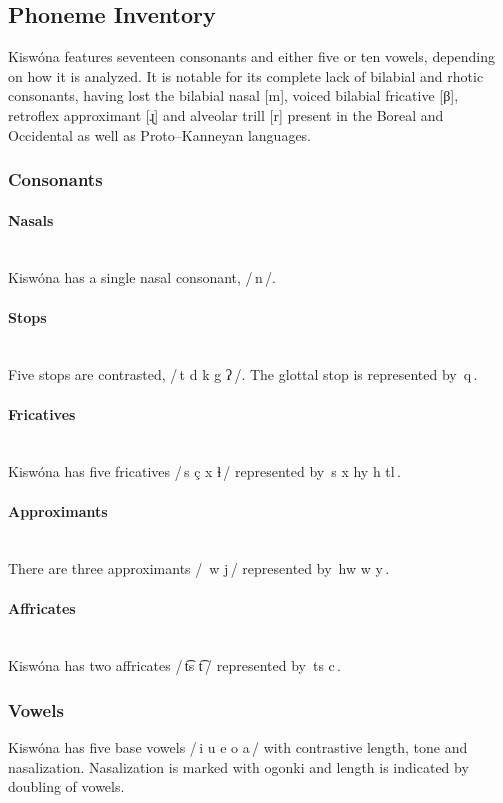 \documentclass[11pt,a4paper,titlepage]{article}
\newcommand\phoneme[1]{/\,#1\,/}
\newcommand\orth[1]{\textlangle\,#1\,\textrangle}
\newcommand\gstop{ʔ}
\newcommand\tl{ɬ}
\begin{document}
		\subsection{Phoneme Inventory}
			Kisw\'ona features seventeen consonants and either five or ten vowels, depending on how it is analyzed. It is notable for its complete lack of bilabial and rhotic consonants, having lost the bilabial nasal [m], voiced bilabial fricative [β], retroflex approximant [ɻ] and alveolar trill [r] present in the Boreal and Occidental as well as Proto–Kanneyan languages.		

			\subsubsection{Consonants}

				\paragraph{Nasals} ~\\
					Kisw\'ona has a single nasal consonant, \phoneme{n}.

				\paragraph{Stops} ~\\
					Five stops are contrasted, \phoneme{t d k g \gstop}. The glottal stop is represented by \orth{q}.

				\paragraph{Fricatives} ~\\
					Kisw\'ona has five fricatives \phoneme{s \esh{} \c{c} x \tl} represented by \orth{s x hy h tl}.
				\paragraph{Approximants} ~\\
					There are three approximants \phoneme{\textturnw{} w j} represented by \orth{hw w y}.

				\paragraph{Affricates} ~\\
					Kisw\'ona has two affricates \phoneme{\t{ts} \t{t\esh}} represented by \orth{ts c}.

			\subsubsection{Vowels}
				Kisw\'ona has five base vowels \phoneme{i u e o a} with contrastive length, tone and nasalization. Nasalization is marked with ogonki and length is indicated by doubling of vowels.
\end{document}
